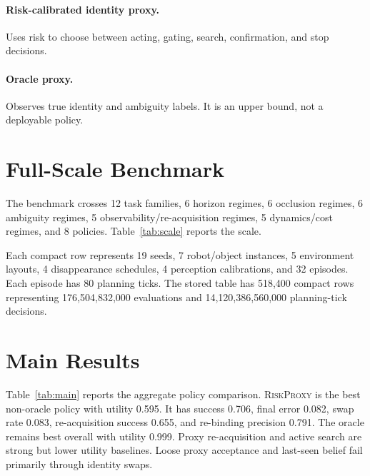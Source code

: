 \documentclass{article}
\newcommand{\method}{\textsc{RiskProxy}\xspace}
\begin{document}
\paragraph{Risk-calibrated identity proxy.}
Uses risk to choose between acting, gating, search, confirmation, and stop decisions.

\paragraph{Oracle proxy.}
Observes true identity and ambiguity labels. It is an upper bound, not a deployable policy.

\section{Full-Scale Benchmark}

The benchmark crosses 12 task families, 6 horizon regimes, 6 occlusion regimes, 6 ambiguity regimes, 5 observability/re-acquisition regimes, 5 dynamics/cost regimes, and 8 policies. Table~\ref{tab:scale} reports the scale.

\begin{table}[t]
\centering
\caption{Full-scale benchmark size. Compact rows summarize repeated seeds, robot/object instances, layouts, disappearance schedules, perception calibrations, episodes, and planning ticks.}
\label{tab:scale}

\end{table}

Each compact row represents 19 seeds, 7 robot/object instances, 5 environment layouts, 4 disappearance schedules, 4 perception calibrations, and 32 episodes. Each episode has 80 planning ticks. The stored table has 518,400 compact rows representing 176,504,832,000 evaluations and 14,120,386,560,000 planning-tick decisions.

\section{Main Results}

Table~\ref{tab:main} reports the aggregate policy comparison. \method is the best non-oracle policy with utility 0.595. It has success 0.706, final error 0.082, swap rate 0.083, re-acquisition success 0.655, and re-binding precision 0.791. The oracle remains best overall with utility 0.999. Proxy re-acquisition and active search are strong but lower utility baselines. Loose proxy acceptance and last-seen belief fail primarily through identity swaps.
\end{document}

